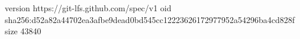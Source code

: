 version https://git-lfs.github.com/spec/v1
oid sha256:d52a82a44702ea3afbe9dead0bd545cc12223626172977952a54296ba4cd828f
size 43840
